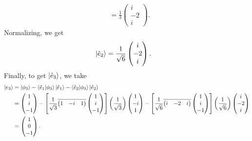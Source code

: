 \documentclass[10pt]{mypackage}
\begin{document}
\begin{example}
\begin{align*}
             &= \frac{1}{3} \begin{pmatrix}i\\-2\\i\end{pmatrix}.
 \end{align*}
 Normalizing, we get
 \begin{align*}
   \ket{\hat{e}_2} &= \frac{1}{\sqrt{6}} \begin{pmatrix}i\\-2\\i\end{pmatrix}.
 \end{align*}
 Finally, to get $\ket{\hat{e}_3}$, we take
 \begin{align*}
   \ket{e_3} &= \ket{\phi_3} - \braket{\hat{e}_1}{\phi_3}\ket{\hat{e}_1} - \braket{\hat{e}_2}{\phi_3}\ket{\hat{e}_2}\\
             &= \begin{pmatrix}1\\i\\-1\end{pmatrix} - \left[\frac{1}{\sqrt{3}} \overline{ \begin{pmatrix}1 & -i & 1\end{pmatrix} } \begin{pmatrix}1\\i\\-1\end{pmatrix}\right] \left(\frac{1}{\sqrt{3}}\right) \begin{pmatrix}1\\-i\\1\end{pmatrix} - \left[\frac{1}{\sqrt{6}} \overline{ \begin{pmatrix}i & -2 & i\end{pmatrix} } \begin{pmatrix}1\\i\\-1\end{pmatrix}\right] \left(\frac{1}{\sqrt{6}}\right) \begin{pmatrix}i\\-2\\i\end{pmatrix}\\
             &= \begin{pmatrix}1\\0\\-1\end{pmatrix}.
 \end{align*}

\end{example}
\end{document}
